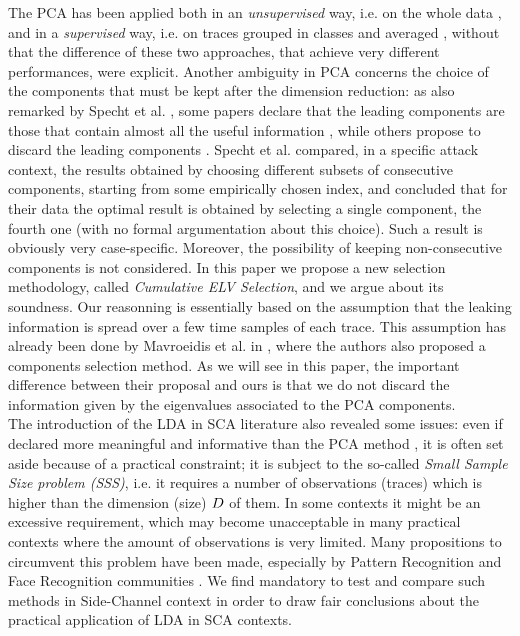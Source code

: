 The PCA has been applied both in an {\em unsupervised} way, i.e. on the whole data \cite{Batina2012,karsmakers2009side}, and in a {\em supervised} way, i.e. on traces grouped in classes and averaged \cite{TAprincipal,choudaryefficient,choudary2014efficient,disassembler,Standaert2008}, without that the difference of these two approaches, that achieve very different performances, were explicit. Another ambiguity in PCA concerns the choice of the components that must be kept after the dimension reduction: as also remarked by Specht et al.  \cite{specht}, some papers declare that the leading components are those that contain almost all the useful information \cite{TAprincipal}, while others propose to discard the leading components \cite{Batina2012}. Specht et al. compared, in a specific attack context, the results obtained by choosing different subsets of consecutive components, starting from some empirically chosen index, and concluded that for their data the optimal result is obtained by selecting a single component, the fourth one (with no formal argumentation about this choice). Such a result is obviously very case-specific. Moreover, the possibility of keeping non-consecutive components is not considered. In this paper we propose a new selection methodology, called {\em Cumulative ELV Selection}, and we argue about its soundness. Our reasonning is essentially based on the assumption that the leaking information is spread over a few time samples of each trace. This assumption has already been done by Mavroeidis et al. in \cite{SCAclassProbl}, where the authors  also proposed a components selection method. As we will see in this paper, the important difference between their proposal and ours is that we do not discard the information given by the eigenvalues associated to the PCA components.  \\

The introduction of the LDA in SCA literature also revealed some issues: even if declared more meaningful and informative than the PCA method \cite{lessIsMore,Standaert2008}, it is often set aside because of a practical constraint; it is subject to the so-called {\em Small Sample Size problem (SSS)}, i.e. it requires a number of observations (traces) which is higher than the dimension (size) $D$ of them. In some contexts it might be an excessive requirement, which may become unacceptable in many practical contexts where the amount of observations is very limited. Many propositions to circumvent this problem have been made, especially by Pattern Recognition and Face Recognition communities \cite{eigenfaces,Chen2000,huang,Yu01adirect}. We find mandatory to test and compare such methods in Side-Channel context in order to draw fair conclusions about the practical application of LDA in SCA contexts.\\

